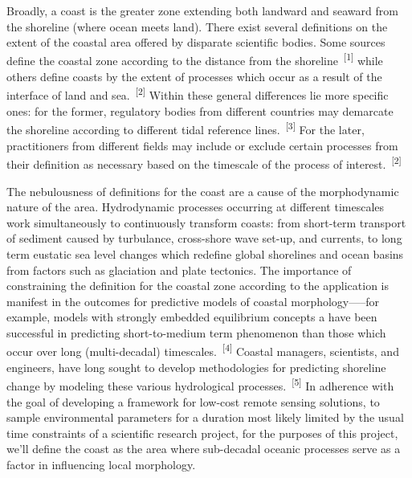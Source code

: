 \documentclass{article}
\begin{document}
\par{\hspace{.5cm}Broadly, a coast is the greater zone extending both landward and seaward from the shoreline (where ocean meets land). There exist several definitions on the extent of the coastal area offered by disparate scientific bodies. Some sources define the coastal zone according to the distance from the shoreline~\textsuperscript{[1]} while others define coasts by the extent of processes which occur as a result of the interface of land and sea.~\textsuperscript{[2]} Within these general differences lie more specific ones: for the former, regulatory bodies from different countries may demarcate the shoreline according to different tidal reference lines.~\textsuperscript{[3]} For the later, practitioners from different fields may include or exclude certain processes from their definition as necessary based on the timescale of the process of interest.~\textsuperscript{[2]}}


\par{The nebulousness of definitions for the coast are a cause of the morphodynamic nature of the area. Hydrodynamic processes occurring at different timescales work simultaneously to continuously transform coasts: from short-term transport of sediment caused by turbulance, cross-shore wave set-up, and currents, to long term eustatic sea level changes which redefine global shorelines and ocean basins from factors such as glaciation and plate tectonics. The importance of constraining the definition for the coastal zone according to the application is manifest in the outcomes for predictive models of coastal morphology—--for example, models with strongly embedded equilibrium concepts a have been successful in predicting short-to-medium term phenomenon than those which occur over long (multi-decadal) timescales.~\textsuperscript{[4]} Coastal managers, scientists, and engineers, have long sought to develop methodologies for predicting shoreline change by modeling these various hydrological processes.~\textsuperscript{[5]} In adherence with the goal of developing a framework for low-cost remote sensing solutions, to sample environmental parameters for a duration most likely limited by the usual time constraints of a scientific research project, for the purposes of this project, we'll define the coast as the area where sub-decadal oceanic processes serve as a factor in influencing local morphology.}
\end{document}
